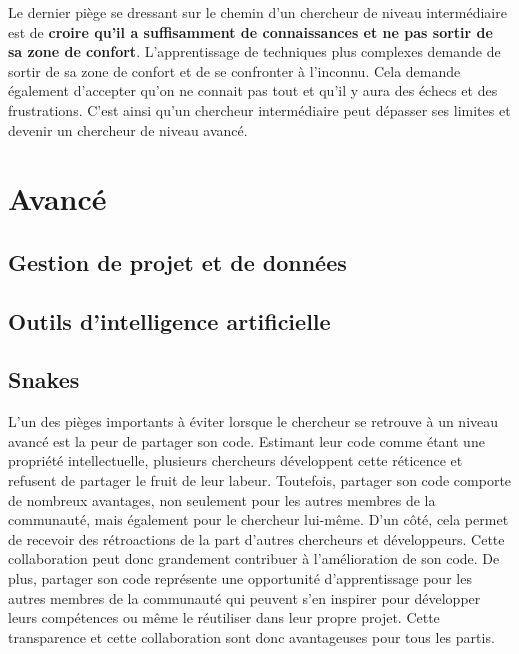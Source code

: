 \documentclass[
  letterpaper,
]{scrbook}
\begin{document}
Le dernier piège se dressant sur le chemin d'un chercheur de niveau
intermédiaire est de \textbf{croire qu'il a suffisamment de
connaissances et ne pas sortir de sa zone de confort}. L'apprentissage
de techniques plus complexes demande de sortir de sa zone de confort et
de se confronter à l'inconnu. Cela demande également d'accepter qu'on ne
connait pas tout et qu'il y aura des échecs et des frustrations. C'est
ainsi qu'un chercheur intermédiaire peut dépasser ses limites et devenir
un chercheur de niveau avancé.

\hypertarget{avancuxe9}{%
\section{Avancé}\label{avancuxe9}}

\hypertarget{gestion-de-projet-et-de-donnuxe9es}{%
\subsection{Gestion de projet et de
données}\label{gestion-de-projet-et-de-donnuxe9es}}

\hypertarget{outils-dintelligence-artificielle-1}{%
\subsection{Outils d'intelligence
artificielle}\label{outils-dintelligence-artificielle-1}}

\hypertarget{snakes}{%
\subsection{Snakes}\label{snakes}}

L'un des pièges importants à éviter lorsque le chercheur se retrouve à
un niveau avancé est la peur de partager son code. Estimant leur code
comme étant une propriété intellectuelle, plusieurs chercheurs
développent cette réticence et refusent de partager le fruit de leur
labeur. Toutefois, partager son code comporte de nombreux avantages, non
seulement pour les autres membres de la communauté, mais également pour
le chercheur lui-même. D'un côté, cela permet de recevoir des
rétroactions de la part d'autres chercheurs et développeurs. Cette
collaboration peut donc grandement contribuer à l'amélioration de son
code. De plus, partager son code représente une opportunité
d'apprentissage pour les autres membres de la communauté qui peuvent
s'en inspirer pour développer leurs compétences ou même le réutiliser
dans leur propre projet. Cette transparence et cette collaboration sont
donc avantageuses pour tous les partis.
\end{document}
